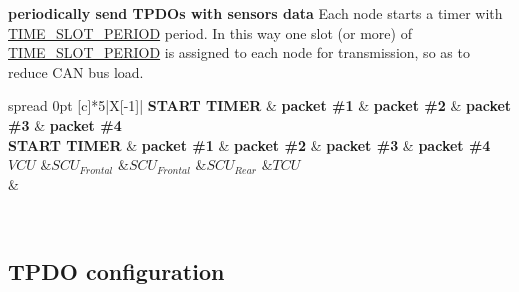 \begin{DoxyEnumerate}
\item {\bfseries periodically send T\+P\+D\+Os with sensors\textquotesingle{} data} Each node starts a timer with \mbox{\hyperlink{group___common__defines__group_ga09c95853fd002fab968d94c5bc44e823}{T\+I\+M\+E\+\_\+\+S\+L\+O\+T\+\_\+\+P\+E\+R\+I\+OD}} period. In this way one slot (or more) of \mbox{\hyperlink{group___common__defines__group_ga09c95853fd002fab968d94c5bc44e823}{T\+I\+M\+E\+\_\+\+S\+L\+O\+T\+\_\+\+P\+E\+R\+I\+OD}} is assigned to each node for transmission, so as to reduce C\+AN bus load.~\newline
~\newline
 \tabulinesep=1mm
\begin{longtabu} spread 0pt [c]{*{5}{|X[-1]}|}
\hline
\rowcolor{\tableheadbgcolor}\textbf{ S\+T\+A\+RT T\+I\+M\+ER  }&\textbf{ packet \#1  }&\textbf{ packet \#2  }&\textbf{ packet \#3  }&\textbf{ packet \#4   }\\
\endfirsthead
\hline
\endfoot
\hline
\rowcolor{\tableheadbgcolor}\textbf{ S\+T\+A\+RT T\+I\+M\+ER  }&\textbf{ packet \#1  }&\textbf{ packet \#2  }&\textbf{ packet \#3  }&\textbf{ packet \#4   }\\
\endhead
$VCU$  &$SCU_{Frontal}$  &$SCU_{Frontal}$  &$SCU_{Rear}$  &$TCU$   \\
&\\
\end{longtabu}
~\newline
 


\end{DoxyEnumerate}

\subsection*{\label{_c_a_n_network_page_TPDO_configuration}%
%
T\+P\+DO configuration}


